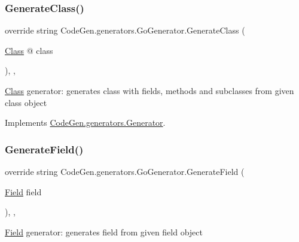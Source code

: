 \subsubsection{\texorpdfstring{Generate\+Class()}{GenerateClass()}}
{\footnotesize\ttfamily override string Code\+Gen.\+generators.\+Go\+Generator.\+Generate\+Class (\begin{DoxyParamCaption}\item[{\mbox{\hyperlink{classCodeGen_1_1generators_1_1Class}{Class}} @}]{class }\end{DoxyParamCaption})\hspace{0.3cm}{\ttfamily [inline]}, {\ttfamily [protected]}, {\ttfamily [virtual]}}



\mbox{\hyperlink{classCodeGen_1_1generators_1_1Class}{Class}} generator\+: generates class with fields, methods and subclasses from given class object  



Implements \mbox{\hyperlink{classCodeGen_1_1generators_1_1Generator_a8847fd8b6d408a0dfc087dcc1dc58340}{Code\+Gen.\+generators.\+Generator}}.

\mbox{\label{classCodeGen_1_1generators_1_1GoGenerator_aa7417b36b964e679a37dfee960148768}} 
\subsubsection{\texorpdfstring{Generate\+Field()}{GenerateField()}}
{\footnotesize\ttfamily override string Code\+Gen.\+generators.\+Go\+Generator.\+Generate\+Field (\begin{DoxyParamCaption}\item[{\mbox{\hyperlink{classCodeGen_1_1generators_1_1Field}{Field}}}]{field }\end{DoxyParamCaption})\hspace{0.3cm}{\ttfamily [inline]}, {\ttfamily [protected]}, {\ttfamily [virtual]}}



\mbox{\hyperlink{classCodeGen_1_1generators_1_1Field}{Field}} generator\+: generates field from given field object  



